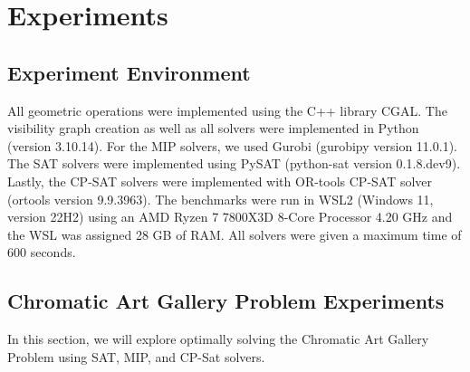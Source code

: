 \chapter{Experiments}
\section{Experiment Environment}
All geometric operations were implemented using the C++ library CGAL. The visibility graph creation as well as all solvers were implemented in Python (version 3.10.14). For the MIP solvers, we used Gurobi (gurobipy version 11.0.1). The SAT solvers were implemented using PySAT (python-sat version 0.1.8.dev9). Lastly, the CP-SAT solvers were implemented with OR-tools CP-SAT solver (ortools version 9.9.3963).
The benchmarks were run in WSL2 (Windows 11, version 22H2) using an AMD Ryzen 7 7800X3D 8-Core Processor 4.20 GHz and the WSL was assigned 28 GB of RAM. All solvers were given a maximum time of 600 seconds.

\section{Chromatic Art Gallery Problem Experiments}
In this section, we will explore optimally solving the Chromatic Art Gallery Problem using SAT, MIP, and CP-Sat solvers.

